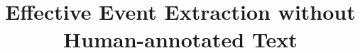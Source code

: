 \documentclass[letterpaper]{article} %
\begin{document}
%
\title{Effective Event Extraction without Human-annotated Text}
\author{}
\maketitle











\end{document}
